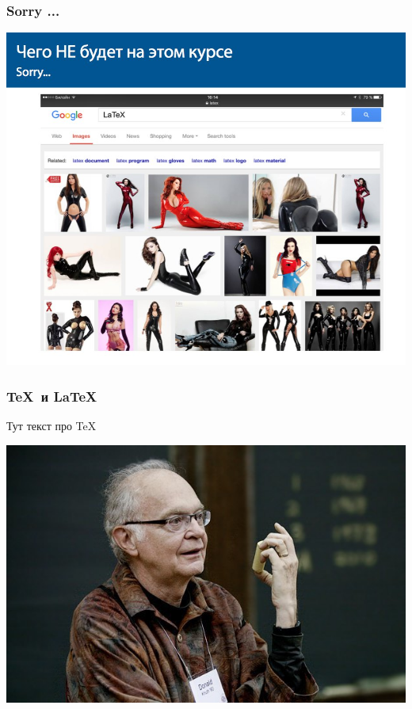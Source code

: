 \documentclass[fullscreen=true]{beamer}
\begin{document}
\begin{frame}
	\frametitle{Sorry ...}
	\vfill
	\pause
	\centerline{\includegraphics[scale=0.3]{images/latex.jpg}}
\end{frame}

\begin{frame}
	\frametitle{\TeX ~и \LaTeX}
	Тут текст про \TeX
	
	\vfill
	\includegraphics[scale=0.3]{images/knuth.jpg} 
\end{frame}
\end{document}
